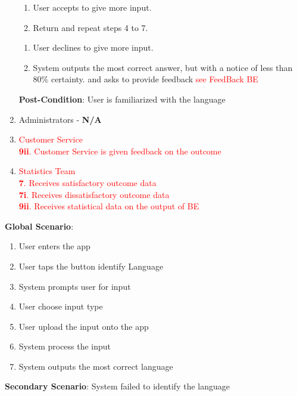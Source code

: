 \begin{enumerate}[{\bf VP1:}]
					\begin{enumerate}[{\bf 8.}i.]
						\item User accepts to give more input.
						\item Return and repeat steps 4 to 7.
					\end{enumerate}
					\begin{enumerate}[{\bf 9}i.]
						\item User declines to give more input.
						\item System outputs the most correct answer, but with a notice of less than 80\% certainty. and asks to provide feedback \textcolor{red}{see FeedBack BE}
					\end{enumerate}
					\textbf{Post-Condition}: User is familiarized with the language 
			\item Administrators - \textbf{N/A}
			\item \textcolor{red}{Customer Service}\\
				\textcolor{red}{\textbf{9ii}. Customer Service is given feedback on the outcome}
			\item \textcolor{red}{Statistics Team}\\
				\textcolor{red}{\textbf{7}. Receives satisfactory outcome data}\\
				\textcolor{red}{\textbf{7i}. Receives dissatisfactory outcome data}\\
				\textcolor{red}{\textbf{9ii}. Receives statistical data on the output of BE}
		\end{enumerate}
	\textbf{Global Scenario}:
	\begin{enumerate}[{\bf 1.}]
		\item User enters the app
		\item User taps the button identify Language
		\item System prompts user for input
		\item User choose input type
		\item User upload the input onto the app
		\item System process the input
		\item System outputs the most correct language
	\end{enumerate}
	\textbf{Secondary Scenario}: System failed to identify the language\\

